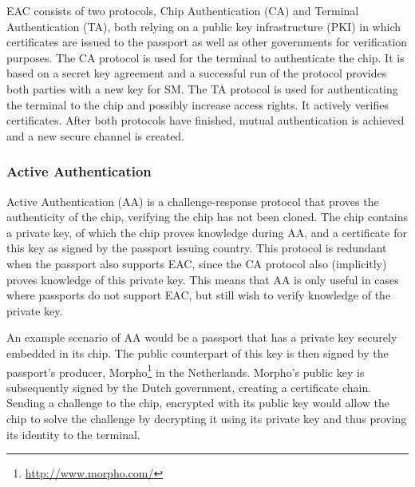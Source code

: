 EAC consists of two protocols, Chip Authentication (CA) and Terminal Authentication (TA), both relying on a public key infrastructure (PKI) in which certificates are issued to the passport as well as other governments for verification purposes. The CA protocol is used for the terminal to authenticate the chip. It is based on a secret key agreement and a successful run of the protocol provides both parties with a new key for SM. The TA protocol is used for authenticating the terminal to the chip and possibly increase access rights. It actively verifies certificates. After both protocols have finished, mutual authentication is achieved and a new secure channel is created.

\subsubsection{Active Authentication}
Active Authentication (AA) is a challenge-response protocol that proves the authenticity of the chip, verifying the chip has not been cloned. The chip contains a private key, of which the chip proves knowledge during AA, and a certificate for this key as signed by the passport issuing country. This protocol is redundant when the passport also supports EAC, since the CA protocol also (implicitly) proves knowledge of this private key. This means that AA is only useful in cases where passports do not support EAC, but still wish to verify knowledge of the private key.

An example scenario of AA would be a passport that has a private key securely embedded in its chip. The public counterpart of this key is then signed by the passport's producer, Morpho\footnote{\url{http://www.morpho.com/}} in the Netherlands. Morpho's public key is subsequently signed by the Dutch government, creating a certificate chain. Sending a challenge to the chip, encrypted with its public key would allow the chip to solve the challenge by decrypting it using its private key and thus proving its identity to the terminal.
